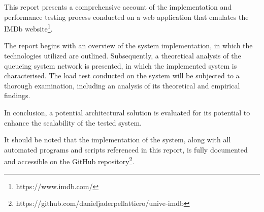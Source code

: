 This report presents a comprehensive account of the implementation and performance testing process conducted on a web application that emulates the IMDb website\footnote[1]{https://www.imdb.com/}.

The report begins with an overview of the system implementation, in which the technologies utilized are outlined. Subsequently, a theoretical analysis of the queueing system network is presented, in which the implemented system is characterised.
The load test conducted on the system will be subjected to a thorough examination, including an analysis of its theoretical and empirical findings.

In conclusion, a potential architectural solution is evaluated for its potential to enhance the scalability of the tested system.

It should be noted that the implementation of the system, along with all automated programs and scripts referenced in this report, is fully documented and accessible on the GitHub repository\footnote[2]{https://github.com/danieljaderpellattiero/unive-imdb}.
